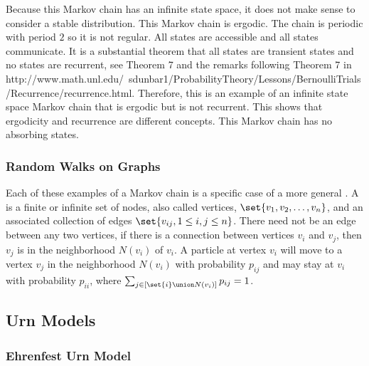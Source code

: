 \documentclass[12pt]{article}
\begin{document}
Because this Markov chain has an infinite state space, it does not make
sense to consider a stable distribution.  This Markov chain is ergodic.
The chain is periodic with period \( 2 \) so it is not regular.  All
states are accessible and all states communicate.  It is a substantial
theorem that all states are transient states and no states are
recurrent, see Theorem 7 and the remarks following Theorem 7 in 
{http://www.math.unl.edu/~sdunbar1/ProbabilityTheory/Lessons/BernoulliTrials/Recurrence/recurrence.html}.
Therefore, this is an example of an infinite state space Markov chain
that is ergodic but is not recurrent.  This shows that ergodicity and
recurrence are different concepts.  This Markov chain has no absorbing
states.

\subsubsection*{Random Walks on Graphs}

Each of these examples of a Markov chain is a specific case of a more
general .  A  is a finite or%
infinite set of nodes, also called vertices, \( \set{v_1, v_2, \dots, v_n}
\), and an associated collection of edges \( \set{v_{ij}, 1 \le i,j \le
n} \).  There need not be an edge between any two vertices, if there is
a connection between vertices \( v_i \) and \( v_j \), then \( v_j \) is
in the neighborhood \( N(v_i) \) of \( v_i \).%
A particle at vertex \( v_i \) will move to a vertex \( v_j \) in the
neighborhood \( N(v_i) \) with probability \( p_{ij} \) and may stay at
\( v_i \) with probability \( p_{ii} \), where \( \sum_{j \in [\set{i}
\union N(v_i)]} p_{ij} = 1 \).

\subsection*{Urn Models}

\subsubsection*{Ehrenfest Urn Model}
\end{document}
